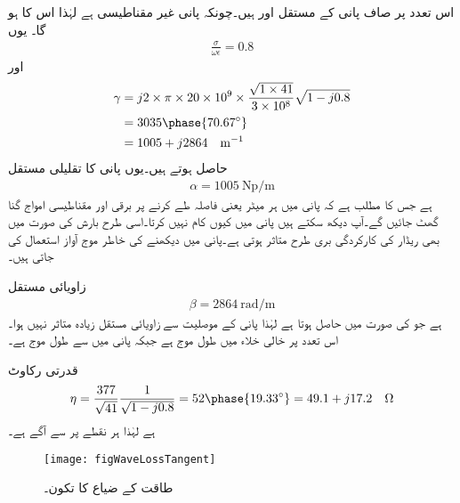 اس تعدد پر صاف پانی کے مستقل  اور  ہیں۔چونکہ پانی غیر مقناطیسی ہے لہٰذا اس کا  ہو گا۔ یوں
\begin{align*}
\frac{\sigma}{\omega \epsilon}=0.8
\end{align*}
اور
\begin{align*}
\gamma&=j 2\times \pi \times 20\times 10^9 \times \frac{\sqrt{1\times 41}}{3\times 10^8} \sqrt{1-j 0.8}\\
&=3035 \phase{70.67^{\circ}}\\
&=1005+j2864 \quad \si{\meter^{-1}}
\end{align*}
حاصل ہوتے ہیں۔یوں پانی کا تقلیلی مستقل
\begin{align*}
\alpha=\SI{1005}{\neper \per \meter}
\end{align*}
ہے جس کا مطلب ہے کہ پانی میں ہر  میٹر یعنی  فاصلہ طے  کرنے پر برقی اور مقناطیسی امواج  گنا گھٹ جائیں گے۔آپ دیکھ سکتے ہیں  پانی میں کیوں کام نہیں کرتا۔اسی طرح بارش کی صورت میں بھی ریڈار کی کارکردگی بری طرح متاثر ہوتی ہے۔پانی میں دیکھنے کی خاطر موج آواز استعمال کی جاتی ہیں۔

زاویائی مستقل
\begin{align*}
\beta=\SI{2864}{\radian \per \meter}
\end{align*}
ہے جو  کی صورت میں  حاصل ہوتا ہے لہٰذا پانی کے موصلیت سے زاویائی مستقل زیادہ متاثر نہیں ہوا۔ اس تعدد پر خالی خلاء میں طول موج  ہے جبکہ پانی میں  سے طول موج  ہے۔

قدرتی رکاوٹ
\begin{align*}
\eta=\frac{377}{\sqrt{41}}\frac{1}{\sqrt{1-j 0.8}}=52\phase{19.33^\circ}=49.1+j17.2 \quad \si{\ohm}
\end{align*}
ہے لہٰذا  ہر نقطے پر  سے  آگے ہے۔


\begin{figure}
\centering
\texttt{[image: figWaveLossTangent]}
\caption{طاقت کے ضیاع کا تکون۔}
\label{شکل_موج_ضیاع_کا_تکون}
\end{figure}


